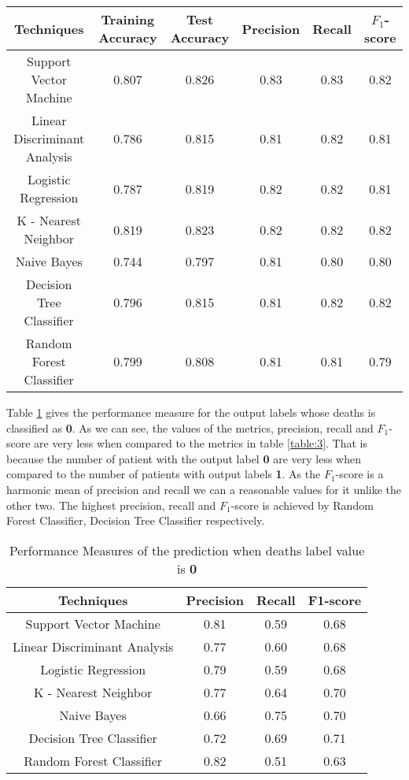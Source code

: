 \documentclass[conference]{IEEEtran}
\begin{document}
\begin{table*}[htb]
\centering
 \begin{tabular}{|c| c c c c c|}
 \hline
 Techniques & Training 		Accuracy & Test 	Accuracy & Precision & Recall & $F_1$-score \\ [0.5ex]
 \hline
 Support Vector Machine & 0.807 & 0.826 & 0.83 & 0.83 & 0.82\\
 \hline
 Linear Discriminant Analysis & 0.786 & 0.815 & 0.81 & 0.82 & 0.81\\
 \hline
 Logistic Regression & 0.787 & 0.819 & 0.82 & 0.82 & 0.81\\
 \hline
 K - Nearest Neighbor & 0.819 & 0.823 & 0.82 & 0.82 & 0.82\\
 \hline
 Naive Bayes & 0.744 & 0.797 & 0.81 & 0.80 & 0.80\\
 \hline
 Decision Tree Classifier & 0.796 & 0.815 & 0.81 & 0.82 & 0.82 \\
 \hline
 Random Forest Classifier & 0.799 & 0.808 & 0.81 & 0.81 & 0.79 \\[0.5ex]
 \hline
\end{tabular}
\vspace*{0.25cm}
\caption{Model Performance of Algorithms}
\label{table:1}
\end{table*}

Table \ref{table:2} gives the performance measure for the output labels whose deaths is classified as \textbf{0}. As we can see, the values of the metrics, precision, recall and $F_1$-score are very less when compared to the metrics in table \ref{table:3}. That is because the number of patient with the output label \textbf{0} are very less when compared to the number of patients with output labels \textbf{1}. As the  $F_1$-score is a harmonic mean of precision and recall we can a reasonable values for it unlike the other two. The highest precision, recall and $F_1$-score is achieved by Random Forest Classifier, Decision Tree Classifier respectively.
\begin{table}[H]
\centering
 \begin{tabular}{|c| c c c|}
 \hline
 Techniques  & Precision & Recall & F1-score \\ [0.5ex]
 \hline
 Support Vector Machine & 0.81 & 0.59 & 0.68 \\
 \hline
 Linear Discriminant Analysis & 0.77 & 0.60 & 0.68\\
 \hline
 Logistic Regression & 0.79 & 0.59 & 0.68\\
 \hline
 K - Nearest Neighbor & 0.77 & 0.64 & 0.70\\
 \hline
 Naive Bayes & 0.66 & 0.75 & 0.70\\
 \hline
 Decision Tree Classifier & 0.72 & 0.69 & 0.71 \\
 \hline
 Random Forest Classifier & 0.82 & 0.51 & 0.63  \\[0.75ex]
 \hline
\end{tabular}
\vspace*{0.25cm}
\caption{Performance Measures of the prediction when deaths label value is \textbf{0}}
\label{table:2}
\end{table}
\end{document}
